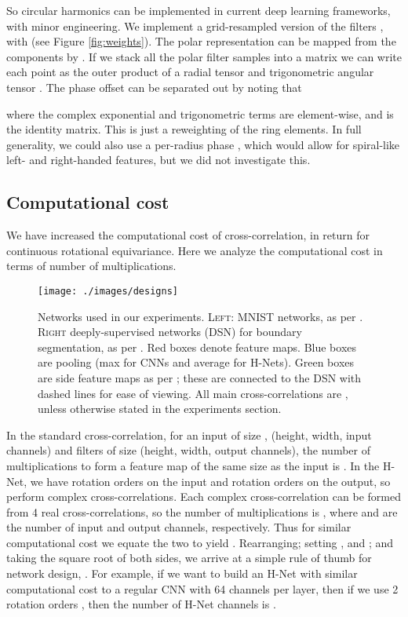 \documentclass[10pt,twocolumn,letterpaper]{article}
\begin{document}
So circular harmonics can be implemented in current deep learning frameworks, with minor engineering. We implement a grid-resampled version of the filters , with  (see Figure \ref{fig:weights}). The polar representation  can be mapped from the components  by . If we stack all the polar filter samples into a matrix we can write each point as the outer product of a radial tensor  and trigonometric angular tensor . The phase offset  can be separated out by noting that

where the complex exponential and trigonometric terms are element-wise, 
and  is the identity matrix. This is just a reweighting of the 
ring elements. In full generality, we could also use a per-radius phase 
, which would allow for spiral-like left- and right-handed 
features, but we did not investigate this.

\subsection{Computational cost}
We have increased the computational cost of cross-correlation, in return for continuous rotational equivariance. Here we analyze the computational cost in terms of number of multiplications.
\begin{figure}[t]
	\texttt{[image: ./images/designs]}
    \caption{Networks used in our experiments. \textsc{Left}:
    MNIST networks, as per \cite{cohen2016group}. \textsc{Right} 
    deeply-supervised networks (DSN) \cite{lee2015deeply} 
    for boundary segmentation, as per \cite{xie2015hed}. Red
    boxes denote feature maps. Blue boxes are pooling (max for CNNs and
    average for H-Nets). Green boxes are side feature maps
    as per \cite{xie2015hed}; these are connected to the DSN with dashed
    lines for ease of viewing. All main cross-correlations are ,
    unless otherwise stated in the experiments section.}
    \label{fig:networks}
\vspace{-1em}
\end{figure}
In the standard cross-correlation, for an input of size , (height, width, input channels) and filters of size  (height, width, output channels), the number of multiplications to form a feature map of the same size as the input is . In the H-Net, we have  rotation orders on the input and  rotation orders on the output, so perform  complex cross-correlations. Each complex cross-correlation can be formed from 4 real cross-correlations, so the number of multiplications is , where  and  are the number of input and output channels, respectively. Thus for similar computational cost we equate the two to yield . Rearranging; setting ,  and ; and taking the square root of both sides, we arrive at a simple rule of thumb for network design,
.
For example, if we want to build an H-Net with similar computational cost to a regular CNN with 64 channels per layer, then if we use 2 rotation orders , then the number of H-Net channels is .
\end{document}
